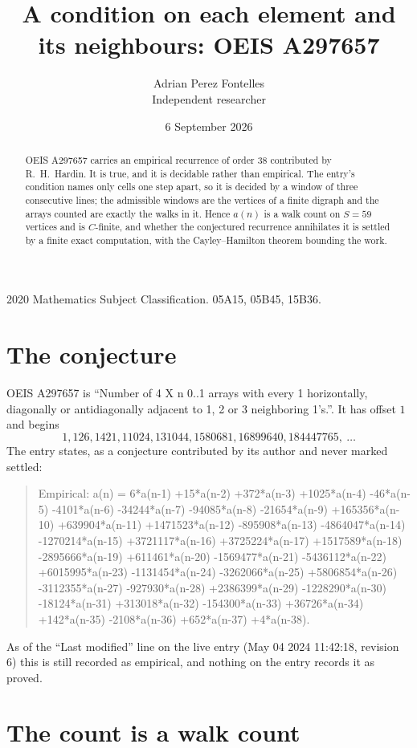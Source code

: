 \documentclass[11pt,a4paper]{article}
\title{A condition on each element and its neighbours: OEIS A297657}
\author{Adrian Perez Fontelles\\ \small Independent researcher}
\date{6 September 2026}
\theoremstyle{plain}
\theoremstyle{definition}
\begin{document}
\maketitle

\begin{abstract}
OEIS A297657 carries an empirical recurrence of order $38$ contributed by R.~H.~Hardin. It is
true, and it is decidable rather than empirical. The entry's condition names only cells one step apart, so it is decided by a window of
three consecutive lines; the
admissible windows are the vertices of a finite digraph and the arrays counted are exactly the
walks in it. Hence $a(n)$ is a walk count on $S=59$ vertices and is $C$-finite, and whether the
conjectured recurrence annihilates it is settled by a finite exact computation, with the
Cayley--Hamilton theorem bounding the work.
\end{abstract}

\noindent\small 2020 Mathematics Subject Classification. 05A15, 05B45, 15B36.\normalsize

\section{The conjecture}

OEIS A297657 is ``Number of 4 X n 0..1 arrays with every 1 horizontally, diagonally or antidiagonally adjacent to 1, 2 or 3 neighboring 1's.''. It has offset $1$ and begins
\[
1, 126, 1421, 11024, 131044, 1580681, 16899640, 184447765,\ \dots
\]
The entry states, as a conjecture contributed by its author and never marked settled:
\begin{quote}
Empirical: a(n) = 6*a(n-1) +15*a(n-2) +372*a(n-3) +1025*a(n-4) -46*a(n-5) -4101*a(n-6) -34244*a(n-7) -94085*a(n-8) -21654*a(n-9) +165356*a(n-10) +639904*a(n-11) +1471523*a(n-12) -895908*a(n-13) -4864047*a(n-14) -1270214*a(n-15) +3721117*a(n-16) +3725224*a(n-17) +1517589*a(n-18) -2895666*a(n-19) +611461*a(n-20) -1569477*a(n-21) -5436112*a(n-22) +6015995*a(n-23) -1131454*a(n-24) -3262066*a(n-25) +5806854*a(n-26) -3112355*a(n-27) -927930*a(n-28) +2386399*a(n-29) -1228290*a(n-30) -18124*a(n-31) +313018*a(n-32) -154300*a(n-33) +36726*a(n-34) +142*a(n-35) -2108*a(n-36) +652*a(n-37) +4*a(n-38).
\end{quote}
As of the ``Last modified'' line on the live entry (May 04 2024 11:42:18, revision 6) this is still
recorded as empirical, and nothing on the entry records it as proved.

\section{The count is a walk count}
\end{document}
